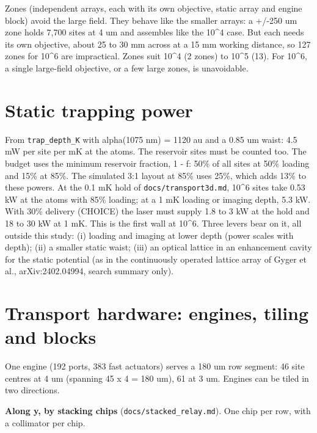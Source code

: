 Zones (independent arrays, each with its own objective, static array and
engine block) avoid the large field. They behave like the smaller
arrays: a +/-250 um zone holds 7,700 sites at 4 um and assembles like
the 10\^{}4 case. But each needs its own objective, about 25 to 30 mm
across at a 15 mm working distance, so 127 zones for 10\^{}6 are
impractical. Zones suit 10\^{}4 (2 zones) to 10\^{}5 (13). For 10\^{}6,
a single large-field objective, or a few large zones, is unavoidable.

\hypertarget{3-static-trapping-power}{%
\section{Static trapping power}\label{megascale-3-static-trapping-power}}

From \texttt{trap\_depth\_K} with alpha(1075 nm) = 1120 au and a 0.85 um
waist: 4.5 mW per site per mK at the atoms. The reservoir sites must be
counted too. The budget uses the minimum reservoir fraction, 1 - f: 50\%
of all sites at 50\% loading and 15\% at 85\%. The simulated 3:1 layout
at 85\% uses 25\%, which adds 13\% to these powers. At the 0.1 mK hold
of \texttt{docs/transport3d.md}, 10\^{}6 sites take 0.53 kW at the atoms
with 85\% loading; at a 1 mK loading or imaging depth, 5.3 kW. With 30\%
delivery (CHOICE) the laser must supply 1.8 to 3 kW at the hold and 18
to 30 kW at 1 mK. This is the first wall at 10\^{}6. Three levers bear
on it, all outside this study: (i) loading and imaging at lower depth
(power scales with depth); (ii) a smaller static waist; (iii) an optical
lattice in an enhancement cavity for the static potential (as in the
continuously operated lattice array of Gyger et al., arXiv:2402.04994,
search summary only).

\hypertarget{4-transport-hardware-engines-tiling-and-blocks}{%
\section{Transport hardware: engines, tiling and
blocks}\label{megascale-4-transport-hardware-engines-tiling-and-blocks}}

One engine (192 ports, 383 fast actuators) serves a 180 um row segment:
46 site centres at 4 um (spanning 45 x 4 = 180 um), 61 at 3 um. Engines
can be tiled in two directions.

\textbf{Along y, by stacking chips} (\texttt{docs/stacked\_relay.md}).
One chip per row, with a collimator per chip.

